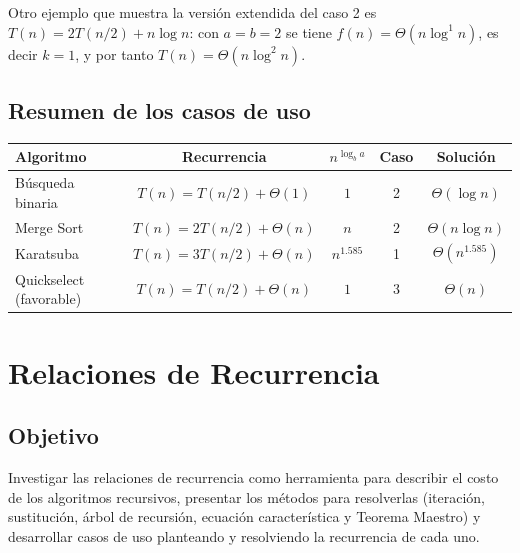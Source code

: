 \documentclass{article}
\begin{document}
        Otro ejemplo que muestra la versión extendida del caso 2 es
        $T(n) = 2T(n/2) + n\log n$: con $a = b = 2$ se tiene
        $f(n) = \Theta(n\log^{1} n)$, es decir $k = 1$, y por tanto
        $T(n) = \Theta(n\log^{2} n)$.
        
        \subsection{Resumen de los casos de uso}
        
        \begin{center}
        \small
        \renewcommand{\arraystretch}{1.5}
        \begin{tabular}{|l|c|c|c|c|}
        \hline
        \textbf{Algoritmo} & \textbf{Recurrencia} & $n^{\log_b a}$ & \textbf{Caso} & \textbf{Solución} \\
        \hline
        Búsqueda binaria & $T(n) = T(n/2) + \Theta(1)$ & $1$ & 2 & $\Theta(\log n)$ \\
        \hline
        Merge Sort & $T(n) = 2T(n/2) + \Theta(n)$ & $n$ & 2 & $\Theta(n\log n)$ \\
        \hline
        Karatsuba & $T(n) = 3T(n/2) + \Theta(n)$ & $n^{1.585}$ & 1 & $\Theta(n^{1.585})$ \\
        \hline
        Quickselect (favorable) & $T(n) = T(n/2) + \Theta(n)$ & $1$ & 3 & $\Theta(n)$ \\
        \hline
        \end{tabular}
        \end{center}



	\section{Relaciones de Recurrencia}
 
        \subsection{Objetivo}
        
        Investigar las relaciones de recurrencia como herramienta para describir el
        costo de los algoritmos recursivos, presentar los métodos para resolverlas
        (iteración, sustitución, árbol de recursión, ecuación característica y
        Teorema Maestro) y desarrollar casos de uso planteando y resolviendo la
        recurrencia de cada uno.
        
\end{document}
